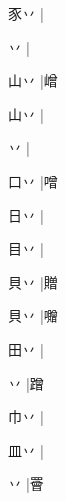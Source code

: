 \begin{multicols}{2}
{{\cjk{}豕丷{\cnjzr{}}}\mktsJzrVerticalBar{}{\cjk{}{\cnsym{}　}{\cnsym{}　}{\cnsym{}　}}|{}\par
{丷{\cnjzr{}}}\mktsJzrVerticalBar{}{\cjk{}{\cnsym{}　}{\cnsym{}　}{\cnsym{}　}}|{}\par
{\cjk{}山丷{\cnjzr{}}}\mktsJzrVerticalBar{}{\cjk{}{\cnsym{}　}{\cnsym{}　}{\cnsym{}　}}|{\cjk{}嶒}\par
{\cjk{}山丷{\cnjzr{}}}\mktsJzrVerticalBar{}{\cjk{}{\cnsym{}　}{\cnsym{}　}{\cnsym{}　}}|{}\par
{丷{\cnjzr{}}}|{}\par
{\cjk{}口丷{\cnjzr{}}}\mktsJzrVerticalBar{}{\cjk{}{\cnsym{}　}{\cnsym{}　}{\cnsym{}　}}|{\cjk{}噌}\par
{\cjk{}日丷{\cnjzr{}}}\mktsJzrVerticalBar{}{\cjk{}{\cnsym{}　}{\cnsym{}　}{\cnsym{}　}}|{}\par
{\cjk{}目丷{\cnjzr{}}}\mktsJzrVerticalBar{}{\cjk{}{\cnsym{}　}{\cnsym{}　}{\cnsym{}　}}|{}\par
{\cjk{}貝丷{\cnjzr{}}}\mktsJzrVerticalBar{}{\cjk{}{\cnsym{}　}{\cnsym{}　}{\cnsym{}　}}|{\cjk{}贈}\par
{\cjk{}貝丷{\cnjzr{}}}|{\cjk{}囎}\par
{\cjk{}田丷{\cnjzr{}}}\mktsJzrVerticalBar{}{\cjk{}{\cnsym{}　}{\cnsym{}　}{\cnsym{}　}}|{}\par
{丷{\cnjzr{}}}\mktsJzrVerticalBar{}{\cjk{}{\cnsym{}　}{\cnsym{}　}{\cnsym{}　}}|{\cjk{}蹭}\par
{\cjk{}巾丷{\cnjzr{}}}\mktsJzrVerticalBar{}{\cjk{}{\cnsym{}　}{\cnsym{}　}{\cnsym{}　}}|{}\par
{\cjk{}皿丷{\cnjzr{}}}|{}\par
{丷{\cnjzr{}}}\mktsJzrVerticalBar{}{\cjk{}{\cnsym{}　}{\cnsym{}　}{\cnsym{}　}}|{\cjk{}罾}\par
}
\end{multicols}
